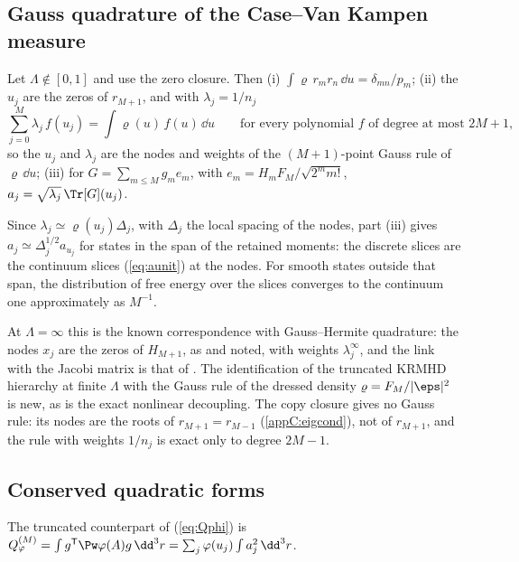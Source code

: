 \subsection{Gauss quadrature of the Case--Van Kampen measure}

\begin{proposition}\label{tr:gaussprop}
Let $\Lambda\notin[0,1]$ and use the zero closure. Then (i) $\int\varrho\,r_mr_n\,\dd u=\delta_{mn}/p_m$; (ii) the $u_j$ are the zeros of $r_{M+1}$, and with $\lambda_j=1/n_j$
\begin{equation}\label{eq:gauss}
  \sum_{j=0}^M\lambda_j\,f(u_j)=\int\varrho(u)\,f(u)\,\dd u\qquad\text{for every polynomial $f$ of degree at most $2M+1$,}
\end{equation}
so the $u_j$ and $\lambda_j$ are the nodes and weights of the $(M+1)$-point Gauss rule of $\varrho\,\dd u$; (iii) for $G=\sum_{m\le M}g_me_m$, with $e_m=H_mF_M/\sqrt{2^mm!}$, $a_j=\sqrt{\lambda_j}\,\Tr[G](u_j)$.
\end{proposition}

Since $\lambda_j\simeq\varrho(u_j)\Delta_j$, with $\Delta_j$ the local spacing of the nodes, part (iii) gives $a_j\simeq\Delta_j^{1/2}a_{u_j}$ for states in the span of the retained moments: the discrete slices are the continuum slices (\ref{eq:aunit}) at the nodes. For smooth states outside that span, the distribution of free energy over the slices converges to the continuum one approximately as $M^{-1}$.

At $\Lambda=\infty$ this is the known correspondence with Gauss--Hermite quadrature: the nodes $x_j$ are the zeros of $H_{M+1}$, as \citet{ParkerDellar2015} and \citet{Tassi2022} noted, with weights $\lambda^\infty_j$, and the link with the Jacobi matrix is that of \citet{GolubWelsch1969}. The identification of the truncated KRMHD hierarchy at finite $\Lambda$ with the Gauss rule of the dressed density $\varrho=F_M/|\eps|^2$ is new, as is the exact nonlinear decoupling. The copy closure gives no Gauss rule: its nodes are the roots of $r_{M+1}=r_{M-1}$ (\ref{appC:eigcond}), not of $r_{M+1}$, and the rule with weights $1/n_j$ is exact only to degree $2M-1$.

\subsection{Conserved quadratic forms}

The truncated counterpart of (\ref{eq:Qphi}) is $Q^{(M)}_\varphi=\int g^{\mathsf T}\Pw\varphi(A)g\,\dd^3r=\sum_j\varphi(u_j)\int a_j^2\,\dd^3r$.

